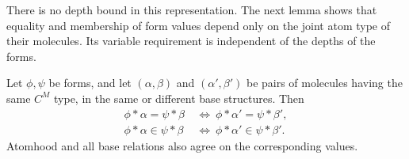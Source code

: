 There is no depth bound in this representation.
The next lemma shows that equality and membership of form values depend
only on the joint atom type of their molecules.
Its variable requirement is independent of the depths of the forms.

\begin{lemma}
\label{hf:atomic-transfer}
Let $\phi,\psi$ be forms, and let $(\alpha,\beta)$ and
$(\alpha',\beta')$ be pairs of molecules having the same $C^M$ type,
in the same or different base structures.  Then
\begin{align*}
 \phi*\alpha=\psi*\beta
   &\ \Longleftrightarrow\
       \phi*\alpha'=\psi*\beta',\\
 \phi*\alpha\in\psi*\beta
   &\ \Longleftrightarrow\
       \phi*\alpha'\in\psi*\beta'.
\end{align*}
Atomhood and all base relations also agree on the corresponding values.
\end{lemma}

